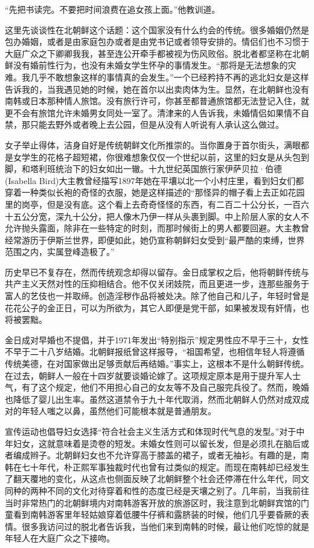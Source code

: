“先把书读完。不要把时间浪费在追女孩上面。”他教训道。

这里先谈谈性在北朝鲜这个话题：这个国家没有什么约会的传统。很多婚姻仍然是包办婚姻，或者是由家庭包办或者是由党书记或者领导安排的。情侣们也不习惯于大庭广众之下卿卿我我，甚至连公开牵手都被视为伤风败俗。脱北者都坚称在北朝鲜没有婚前性行为，也没有未婚女学生怀孕的事情发生。“那将是无法想象的灾难。我几乎不敢想象这样的事情真的会发生。”一个已经矜持不再的逃北妇女是这样告诉我的，当我遇见她的时候，她在首尔以出卖肉体为生。显然，在北朝鲜也没有南韩或日本那种情人旅馆。没有旅行许可，你甚至都普通旅馆都无法登记入住，就更不会有旅馆允许未婚男女同处一室了。清津来的人告诉我，未婚情侣如果情不自禁，那只能去野外或者晚上去公园，但是从没有人听说有人承认这么做过。

女子举止得体，洁身自好是传统朝鲜文化所推崇的。当你置身于首尔街头，满眼都是女学生的花格子超短裙，你很难想象仅仅一个世纪以前，这里的妇女是从头包到脚，和塔利班统治下的妇女如出一辙。十九世纪英国旅行家伊萨贝拉·伯德(Isabella Bird)大主教曾经描写1897年她在平壤以北一个小村庄里，看到妇女们都穿着一种类似长袍的奇怪的衣服，她是这样描述的“那怪异的帽子看上去正如花园里的岗亭，但是没有底。这个看上去奇奇怪怪的东西，有二百二十公分长，一百六十五公分宽，深九十公分，把人像木乃伊一样从头裹到脚。中上阶层人家的女人不允许抛头露面，除非在一些特定的时刻，而那时候街上的男人都要回避。大主教曾经常游历于伊斯兰世界，即便如此，她仍宣称朝鲜妇女受到“最严酷的束缚，世界范围之内，实属登峰造极了。”

历史早已不复存在，然而传统观念却得以留存。金日成掌权之后，他将朝鲜传统与共产主义天然对性的压抑相结合。他不仅关闭妓院，而且更进一步，连那些服务于富人的艺伎也一并取缔。创造淫秽作品将被处决。除了他自己和儿子，年轻时曾是花花公子的金正日，可以为所欲为，其它人即便是党干部，如果被发现有奸情，也将被罢黜。

金日成对早婚也不提倡，并于1971年发出“特别指示”规定男性应不早于三十，女性不早于二十八岁结婚。北朝鲜报纸曾这样报导，“祖国希望，也相信年轻人将遵循传统美德，在对国家做出足够贡献后再结婚。”事实上，这根本不是什么朝鲜传统。在过去，朝鲜人一般在十四岁就要谈婚论嫁了。这项规定原本是用于提升军人士气，有了这个规定，他们不用担心自己的女友等不及自己服完兵役了。然而，晚婚也降低了婴儿出生率。虽然这道禁令于九十年代取消，然而北朝鲜人仍然对成双成对的年轻人嗤之以鼻，虽然他们可能根本就是普通朋友。

宣传运动也倡导妇女选择“符合社会主义生活方式和体现时代气息的发型。”对于中年妇女，这就意味着是烫卷的短发。未婚女性则可以留长发，但是必须扎在脑后或者编成辫子。北朝鲜妇女也不允许穿高于膝盖的裙子，或者无袖衫。有趣的是，南韩在七十年代，朴正熙军事独裁时代也曾有过类似的规定。而现在南韩却已经发生了翻天覆地的变化，从这点也侧面反映了北朝鲜整个社会还停滞在什么年代，同文同种的两种不同的文化对待穿着和性的态度已经是天壤之别了。几年前，当我前往当时非常热门的北朝鲜境内对南韩游客开放的旅游区时，我注意到北朝鲜宾馆的门童看到南韩游客里年轻姑娘穿着低腰牛仔裤和露脐装的时候，他们几乎要昏厥的表情。很多我访问过的脱北者告诉我，当他们来到南韩的时候，最让他们吃惊的就是年轻人在大庭广众之下接吻。

